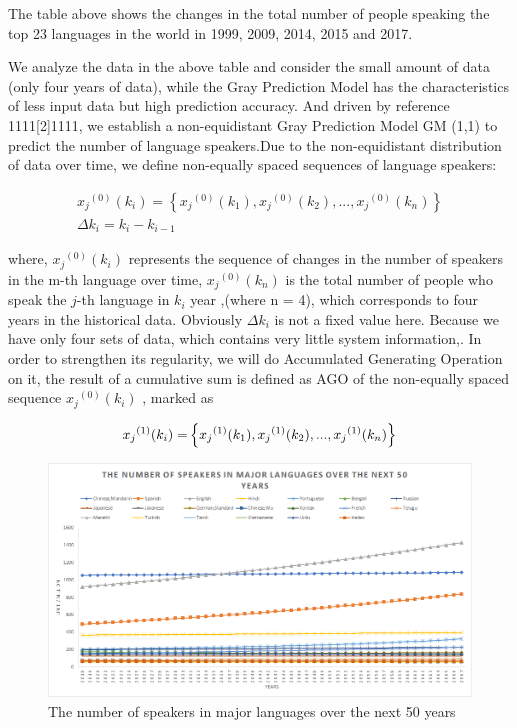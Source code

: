 \par The table above shows the changes in the total number of people speaking the top 23 languages in the world in 1999, 2009, 2014, 2015 and 2017.
\par We analyze the data in the above table and consider the small amount of data (only four years of data), while the Gray Prediction Model has the characteristics of less input data but high prediction accuracy. And driven by reference 1111[2]1111, we establish a non-equidistant Gray Prediction Model GM (1,1) to predict the number of language speakers.Due to the non-equidistant distribution of data over time, we define non-equally spaced sequences of language speakers:

\begin{equation}
\begin{aligned}
{x_j}^{(0)}({k_i}) = \left\{ {{x_j}^{(0)}({k_1}),{x_j}^{(0)}({k_2}),...,{x_j}^{(0)}({k_n})} \right\} \\
\Delta {k_i} = {k_i} - {k_{i - 1}}
\end{aligned}
\end{equation}

\par where, ${x_j}^{(0)}({k_i})$ represents the sequence of changes in the number of speakers in the m-th language over time, ${x_j}^{(0)}({k_n})$  is the total number of people who speak the $j$-th language in ${k_i}$ year ,(where n = 4), which corresponds to four years in the historical data. Obviously $\Delta {k_i}$  is not a fixed value here. Because we have only four sets of data, which contains very little system information,. In order to strengthen its regularity, we will do Accumulated Generating Operation on it, the result of a cumulative sum is defined as AGO of the non-equally spaced sequence ${x_j}^{(0)}({k_i})$ , marked as

\begin{equation}
{x_j}^{(1)}{\rm{(}}{k_i}{\rm{) = }}\left\{ {{x_j}^{(1)}({k_1}),{x_j}^{(1)}({k_2}),...,{x_j}^{(1)}({k_n})} \right\}\label{aa1}
\end{equation}

\begin{figure}[H]
	\centering
	\includegraphics[width=1\linewidth]{figures/next50number}
	\caption{The number of speakers in major languages over the next 50 years}
	\label{fig:next50number}
\end{figure}

